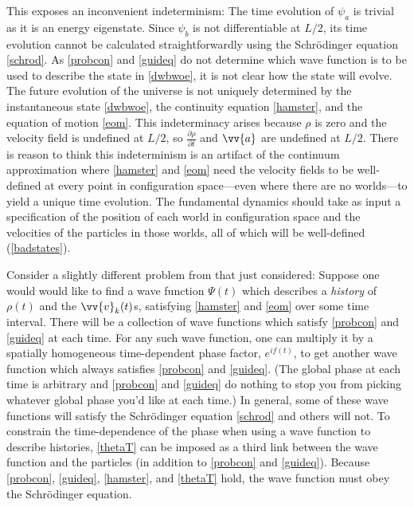 \documentclass[onecolumn,secnumarabic,balancelastpage,amsmath,amssymb,nofootinbib]{article}
\begin{document}
This exposes an inconvenient indeterminism: The time evolution of $\psi_a$ is trivial as it is an energy eigenstate.  Since $\psi_b$ is not differentiable at $L/2$, its time evolution cannot be calculated straightforwardly using the Schr\"{o}dinger equation \eqref{schrod}.  As  \eqref{probcon} and \eqref{guideq} do not determine which wave function is to be used to describe the state in \eqref{dwbwoe}, it is not clear how the state will evolve.  The future evolution of the universe is not uniquely determined by the instantaneous state \eqref{dwbwoe}, the continuity equation \eqref{hamster}, and the equation of motion \eqref{eom}.  This indeterminacy arises because $\rho$ is zero and the velocity field is undefined at $L/2$, so $\frac{\partial \rho}{\partial t}$ and $\vv{a}$ are undefined at $L/2$.  There is reason to think this indeterminism is an artifact of the continuum approximation where \eqref{hamster} and \eqref{eom} need the velocity fields to be well-defined at every point in configuration space---even where there are no worlds---to yield a unique time evolution. The fundamental dynamics should take as input a specification of the position of each world in configuration space and the velocities of the particles in those worlds, all of which will be well-defined (\textsection \ref{badstates}).

Consider a slightly different problem from that just considered: Suppose one would would like to find a wave function $\Psi(t)$ which describes a \emph{history} of $\rho(t)$ and the $\vv{v}_k(t)$s, satisfying \eqref{hamster} and \eqref{eom} over some time interval.  There will be a collection of wave functions which satisfy \eqref{probcon} and \eqref{guideq} at each time.  For any such wave function, one can multiply it by a spatially homogeneous time-dependent phase factor, $e^{if(t)}$, to get another wave function which always satisfies \eqref{probcon} and \eqref{guideq}.  (The global phase at each time is arbitrary and \eqref{probcon} and \eqref{guideq} do nothing to stop you from picking whatever global phase you'd like at each time.)  In general, some of these wave functions will satisfy the Schr\"{odinger} equation \eqref{schrod} and others will not.  To constrain the time-dependence of the phase when using a wave function to describe histories, \eqref{thetaT} can be imposed as a third link between the wave function and the particles (in addition to \eqref{probcon} and \eqref{guideq}).  Because \eqref{probcon}, \eqref{guideq}, \eqref{hamster}, and \eqref{thetaT} hold, the wave function must obey the Schr\"{o}dinger equation.
\end{document}
